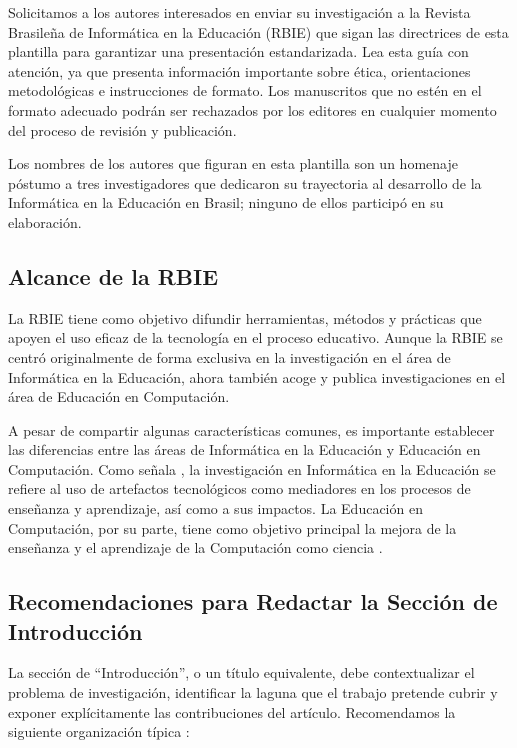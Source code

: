 \documentclass[spanish]{rbie2026}%
\begin{document}
Solicitamos a los autores interesados en enviar su investigación a la Revista Brasileña de Informática en la Educación (RBIE) que sigan las directrices de esta plantilla para garantizar una presentación estandarizada. Lea esta guía con atención, ya que presenta información importante sobre ética, orientaciones metodológicas e instrucciones de formato. Los manuscritos que no estén en el formato adecuado podrán ser rechazados por los editores en cualquier momento del proceso de revisión y publicación.

Los nombres de los autores que figuran en esta plantilla son un homenaje póstumo a tres investigadores que dedicaron su trayectoria al desarrollo de la Informática en la Educación en Brasil; ninguno de ellos participó en su elaboración.

\subsection{Alcance de la RBIE}

La RBIE tiene como objetivo difundir herramientas, métodos y prácticas que apoyen el uso eficaz de la tecnología en el proceso educativo. Aunque la RBIE se centró originalmente de forma exclusiva en la investigación en el área de Informática en la Educación, ahora también acoge y publica investigaciones en el área de Educación en Computación.

A pesar de compartir algunas características comunes, es importante establecer las diferencias entre las áreas de Informática en la Educación y Educación en Computación. Como señala \cite{Bispo2020}, la investigación en Informática en la Educación se refiere al uso de artefactos tecnológicos como mediadores en los procesos de enseñanza y aprendizaje, así como a sus impactos. La Educación en Computación, por su parte, tiene como objetivo principal la mejora de la enseñanza y el aprendizaje de la Computación como ciencia \citep{holmboe2001research}.


\subsection{Recomendaciones para Redactar la Sección de Introducción}

La sección de ``Introducción'', o un título equivalente, debe contextualizar el problema de investigación, identificar la laguna que el trabajo pretende cubrir y exponer explícitamente las contribuciones del artículo. Recomendamos la siguiente organización típica \citep{ecarnort_writing_article_2015}:
\end{document}

